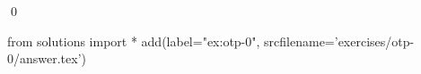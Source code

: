 
\begin{ex} 
  \label{ex:otp-0}
  
  \qed
\end{ex} 
\begin{python0}
from solutions import *
add(label="ex:otp-0",
    srcfilename='exercises/otp-0/answer.tex') 
\end{python0}
